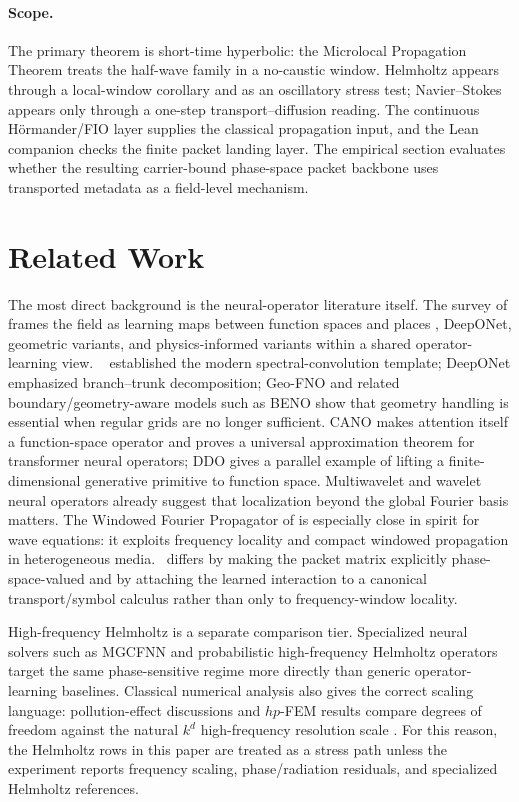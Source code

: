 \paragraph{Scope.}
The primary theorem is short-time hyperbolic: the Microlocal Propagation Theorem treats the half-wave family in a no-caustic window.  Helmholtz appears through a local-window corollary and as an oscillatory stress test; Navier--Stokes appears only through a one-step transport--diffusion reading.  The continuous H\"ormander/FIO layer supplies the classical propagation input, and the Lean companion checks the finite packet landing layer.  The empirical section evaluates whether the resulting carrier-bound phase-space packet backbone uses transported metadata as a field-level mechanism.

\section{Related Work}
\label{sec:related}

The most direct background is the neural-operator literature itself. The survey of \citet{kovachki2023neuraloperator} frames the field as learning maps between function spaces and places \FNO, DeepONet, geometric variants, and physics-informed variants within a shared operator-learning view. \FNO\ \citep{li2021fno} established the modern spectral-convolution template; DeepONet \citep{lu2021deeponet} emphasized branch--trunk decomposition; Geo-FNO \citep{li2023geofno} and related boundary/geometry-aware models such as BENO \citep{wang2024beno} show that geometry handling is essential when regular grids are no longer sufficient. CANO \citep{calvello2025cano} makes attention itself a function-space operator and proves a universal approximation theorem for transformer neural operators; DDO \citep{lim2025ddo} gives a parallel example of lifting a finite-dimensional generative primitive to function space. Multiwavelet and wavelet neural operators \citep{gupta2021multiwavelet,tripura2022wno} already suggest that localization beyond the global Fourier basis matters. The Windowed Fourier Propagator of \citet{cai2026wfp} is especially close in spirit for wave equations: it exploits frequency locality and compact windowed propagation in heterogeneous media. \MiNO\ differs by making the packet matrix explicitly phase-space-valued and by attaching the learned interaction to a canonical transport/symbol calculus rather than only to frequency-window locality.

High-frequency Helmholtz is a separate comparison tier.  Specialized neural solvers such as MGCFNN \citep{xie2025mgcfnn} and probabilistic high-frequency Helmholtz operators \citep{zou2026probabilistichelmholtz} target the same phase-sensitive regime more directly than generic operator-learning baselines.  Classical numerical analysis also gives the correct scaling language: pollution-effect discussions and $hp$-FEM results compare degrees of freedom against the natural $k^d$ high-frequency resolution scale \citep{spence2023hpfempollution}.  For this reason, the Helmholtz rows in this paper are treated as a stress path unless the experiment reports frequency scaling, phase/radiation residuals, and specialized Helmholtz references.

